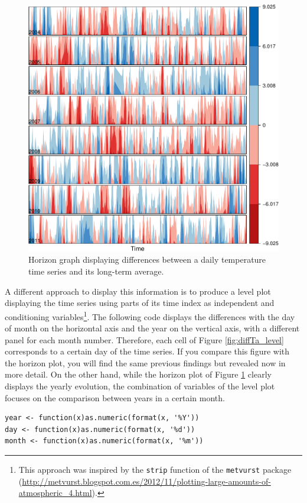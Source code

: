 \begin{figure}[htb]
\centering
\includegraphics[width=.9\linewidth]{figs/diffTa_horizon.pdf}
\caption{\label{fig:diffTa_horizon}Horizon graph displaying differences between a daily temperature time series and its long-term average.}
\end{figure}

A different approach to display this information is to produce a level
plot displaying the time series using parts of its time index as
independent and conditioning variables\footnote{This approach was inspired by the \texttt{strip} function of the
\texttt{metvurst} package
(\url{http://metvurst.blogspot.com.es/2012/11/plotting-large-amounts-of-atmospheric_4.html}).}. The following code
displays the differences with the day of month on the horizontal axis
and the year on the vertical axis, with a different panel for each
month number. Therefore, each cell of Figure \ref{fig:diffTa_level}
corresponds to a certain day of the time series. If you compare this
figure with the horizon plot, you will find the same previous findings
but revealed now in more detail. On the other hand, while the horizon
plot of Figure \ref{fig:diffTa_horizon} clearly displays the yearly
evolution, the combination of variables of the level plot focuses on
the comparison between years in a certain month.

\lstset{language=R,numbers=none}
\begin{lstlisting}
year <- function(x)as.numeric(format(x, '%Y'))
day <- function(x)as.numeric(format(x, '%d'))
month <- function(x)as.numeric(format(x, '%m'))
\end{lstlisting}

